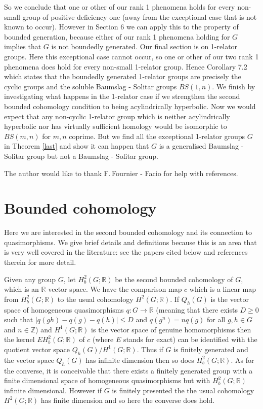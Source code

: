 \documentclass[11pt,reqno]{amsart}
\numberwithin{equation}{section}
\newcommand{\Z}{\mathbb{Z}}
\newcommand{\R}{\mathbb{R}}
\newcommand{\leqs}{\leqslant}
\newcommand{\geqs}{\geqslant}
\theoremstyle{definition}
\theoremstyle{remark}
\begin{document}
So we conclude that one or other of our rank 1 phenomena holds for every
non-small group of positive deficiency one (away from the exceptional
case that is not known to occur). However in Section 6 we can apply
this to the property of bounded generation, because either of our rank 1
phenomena holding for $G$ implies that $G$ is not boundedly generated.
Our final section is on 1-relator groups. Here this exceptional case
cannot occur, so one or other of our two rank 1 phenomena does hold for
every non-small 1-relator group. Hence Corollary 7.2 which states that the
boundedly generated 1-relator groups are precisely the cyclic groups and
the soluble Baumslag - Solitar groups $BS(1,n)$. We finish by investigating
what happens in the 1-relator case
if we strengthen the second bounded cohomology condition to
being acylindrically hyperbolic. Now we would expect that any non-cyclic
1-relator group which is neither acylindrically hyperbolic nor has virtually
sufficient homology would be isomorphic to $BS(m,n)$ for $m,n$ coprime.
But we find all the exceptional 1-relator groups $G$ in Theorem \ref{last}
and show it can happen that $G$ is a generalised Baumslag - Solitar group
but not a Baumslag - Solitar group.

The author would like to thank F.\,Fournier - Facio for help with references.


\section{Bounded cohomology}

Here we are interested in the second bounded cohomology and its connection
to quasimorphisms. We give brief details and
definitions because this is an area that is very well covered in the
literature: see the papers cited below and references therein for more detail.

Given any group $G$, let $H^2_b(G;\R)$ be the second bounded cohomology of
$G$, which is an $\R$-vector space. We have the comparison map $c$ which
is a linear map from $H^2_b(G;\R)$ to the usual cohomology $H^2(G;\R)$.
If $Q_h(G)$ is the vector space of homogeneous quasimorphisms
$q:G\rightarrow\R$ (meaning that there exists $D\geqs 0$ such that
$|q(gh)-q(g)-q(h)|\leqs D$ and $q(g^n)=nq(g)$ for all $g,h\in G$ and
$n\in\Z$) and $H^1(G;\R)$ is the vector space of genuine homomorphisms
then the kernel $EH^2_b(G;\R)$ of $c$ (where $E$ stands for exact) can
be identified with the quotient vector space $Q_h(G)/H^1(G;\R)$.
Thus if $G$ is finitely generated and the vector space $Q_h(G)$ has infinite
dimension then so does $H^2_b(G;\R)$. As for the converse,
it is conceivable that there exists a finitely
generated group with a finite dimensional
space of homogeneous quasimorphisms but with $H^2_b(G;\R)$ infinite
dimensional. However if $G$ is finitely presented the the usual cohomology
$H^2(G;\R)$ has finite dimension and so here the converse does hold.
\end{document}
